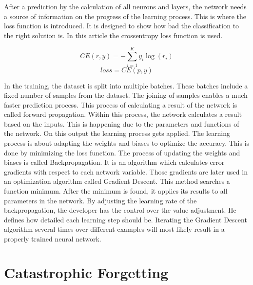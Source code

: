 After a prediction by the calculation of all neurons and layers, the network needs a source of information on the progress of the learning process.
This is where the loss function is introduced.
It is designed to show how bad the classification to the right solution is.
In this article the crossentropy loss function is used.
\cite{math_nn_skalski, medium_nn_from_scratch}

\begin{equation}
    CE(r,y) = -\sum_{i=1}^K y_i \log(r_i)
\end{equation}
\begin{equation}
    loss = CE(p, y)
\end{equation}

In the training, the dataset is split into multiple batches.
These batches include a fixed number of samples from the dataset.
The joining of samples enables a much faster prediction process.
This process of calculating a result of the network is called forward propagation.
Within this process, the network calculates a result based on the inputs.
This is happening due to the parameters and functions of the network.
On this output the learning process gets applied.
\cite{math_nn_skalski, medium_nn_from_scratch}
\newline
The learning process is about adapting the weights and biases to optimize the accuracy.
This is done by minimizing the loss function.
The process of updating the weights and biases is called Backpropagation.
It is an algorithm which calculates error gradients with respect to each network variable. %
Those gradients are later used in an optimization algorithm called Gradient Descent.
This method searches a function minimum.
After the minimum is found, it applies its results to all parameters in the network.
By adjusting the learning rate of the backpropagation, the developer has the control over the value adjustment.
He defines how detailed each learning step should be.
\cite{math_nn_andrey}
\newline
Iterating the Gradient Descent algorithm several times over different examples will most likely result in a properly trained neural network.

\section{Catastrophic Forgetting}
\label{catastrophic_forgetting}


